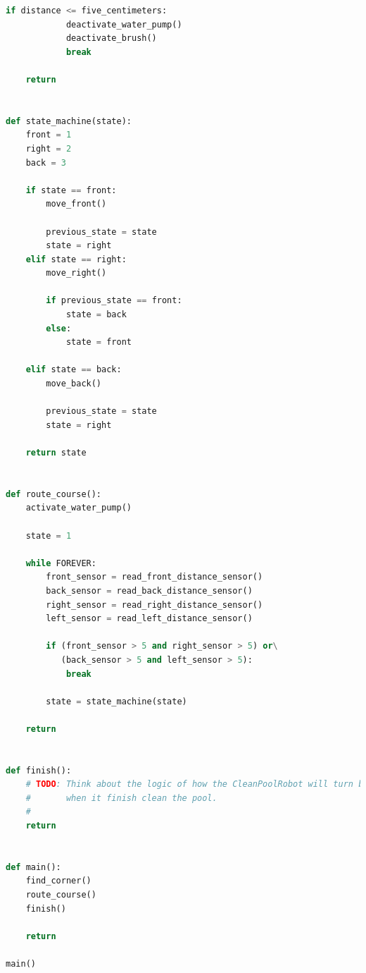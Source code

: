 \begin{lstlisting}[language=Python, label=services, caption=Código da Camada de Aplicação]
        if distance <= five_centimeters:
            deactivate_water_pump()
            deactivate_brush()
            break

    return


def state_machine(state):
    front = 1
    right = 2
    back = 3

    if state == front:
        move_front()

        previous_state = state
        state = right
    elif state == right:
        move_right()

        if previous_state == front:
            state = back
        else:
            state = front

    elif state == back:
        move_back()

        previous_state = state
        state = right

    return state


def route_course():
    activate_water_pump()

    state = 1

    while FOREVER:
        front_sensor = read_front_distance_sensor()
        back_sensor = read_back_distance_sensor()
        right_sensor = read_right_distance_sensor()
        left_sensor = read_left_distance_sensor()

        if (front_sensor > 5 and right_sensor > 5) or\
           (back_sensor > 5 and left_sensor > 5):
            break

        state = state_machine(state)

    return


def finish():
    # TODO: Think about the logic of how the CleanPoolRobot will turn back
    #       when it finish clean the pool.
    #
    return


def main():
    find_corner()
    route_course()
    finish()

    return

main()
\end{lstlisting}
